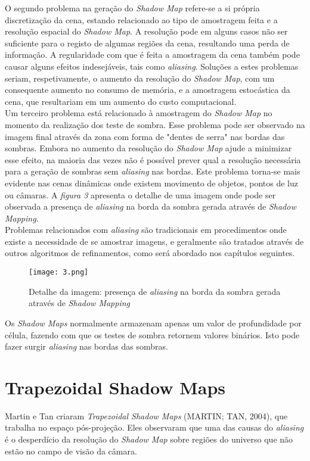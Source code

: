 \documentclass[12pt]{article}
\begin{document}
O segundo problema na geração do {\it Shadow Map} refere-se a si própria discretização da cena, estando relacionado ao tipo de amostragem feita e a resolução espacial do {\it Shadow Map}. A resolução pode em alguns casos não ser suficiente para o registo de algumas regiões da cena, resultando uma perda de informação. A regularidade com que é feita a amostragem da cena também pode causar alguns efeitos indesejáveis, tais como {\it aliasing}.
Soluções a estes problemas seriam, respetivamente, o aumento da resolução do {\it Shadow Map}, com um consequente aumento no consumo de memória, e a amostragem estocástica da cena, que resultariam em um aumento do custo computacional.\\

Um terceiro problema está relacionado à amostragem do {\it Shadow Map} no momento da realização dos teste de sombra. Esse problema pode ser observado na imagem final através da zona com forma de "dentes de serra" nas bordas das sombras. Embora no aumento da resolução do {\it Shadow Map} ajude a minimizar esse efeito, na maioria das vezes não é possível prever qual a resolução necessária para a geração de sombras sem {\it aliasing} nas bordas. Este problema torna-se mais evidente nas cenas dinâmicas onde existem movimento de objetos, pontos de luz ou câmaras. A {\it figura 3} apresenta o detalhe de uma imagem onde pode ser observada a presença de {\it aliasing} na borda da sombra gerada através de {\it Shadow Mapping}.\\

Problemas relacionados com {\it aliasing} são tradicionais em procedimentos onde existe a necessidade de se amostrar imagens, e geralmente são tratados através de outros algoritmos de refinamentos, como será abordado nos capítulos seguintes.

\begin{figure}[!h]
\centering
\texttt{[image: 3.png]}
\caption{Detalhe da imagem: presença de {\it aliasing} na borda da sombra gerada através de {\it Shadow Mapping}}
\label{img3}
\end{figure}
 




Os {\it Shadow Maps} normalmente armazenam apenas um valor de profundidade por célula, fazendo com que os testes de sombra retornem valores binários. Isto pode fazer surgir {\it aliasing} nas bordas das sombras.
\newpage

\section{Trapezoidal Shadow Maps}
\vspace{10 mm}
\hspace{7 mm}Martin e Tan criaram {\it Trapezoidal Shadow Maps} (MARTIN; TAN, 2004), que trabalha no espaço pós-projeção. Eles observaram que uma das causas do {\it aliasing} é o desperdício da resolução do {\it Shadow Map} sobre regiões do universo que não estão no campo de visão da câmara. \\
\end{document}

